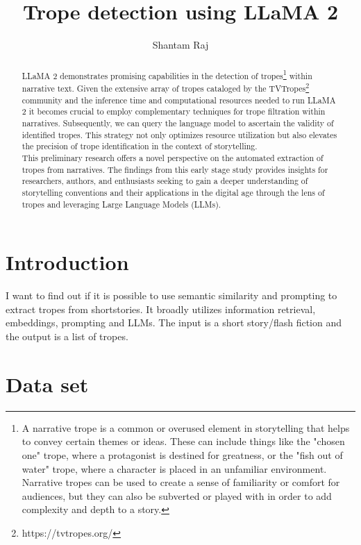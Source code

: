 \documentclass[11pt]{article}
\title{Trope detection using LLaMA 2 \\


}
\author{Shantam Raj}
\begin{document}
\maketitle

\begin{abstract}
LLaMA 2 \cite{touvron_2023_llama} demonstrates promising capabilities in the detection of tropes\footnote[1]{A narrative trope is a common or overused element in storytelling that helps to convey certain themes or ideas. These can include things like the "chosen one" trope, where a protagonist is destined for greatness, or the "fish out of water" trope, where a character is placed in an unfamiliar environment. Narrative tropes can be used to create a sense of familiarity or comfort for audiences, but they can also be subverted or played with in order to add complexity and depth to a story.} within narrative text. Given the extensive array of tropes cataloged by the TVTropes\footnote[2]{https://tvtropes.org/} community and the inference time and computational resources needed to run LLaMA 2 it becomes crucial to employ complementary techniques for trope filtration within narratives. Subsequently, we can query the language model to ascertain the validity of identified tropes. This strategy not only optimizes resource utilization but also elevates the precision of trope identification in the context of storytelling.
\\
This preliminary research offers a novel perspective on the automated extraction of tropes from narratives. The findings from this early stage study provides insights for researchers, authors, and enthusiasts seeking to gain a deeper understanding of storytelling conventions and their applications in the digital age through the lens of tropes and leveraging Large Language Models (LLMs).
\end{abstract}

\section{Introduction}
I want to find out if it is possible to use semantic similarity and prompting to extract tropes from shortstories. It broadly utilizes information retrieval, embeddings, prompting and LLMs. The input is a short story/flash fiction and the output is a list of tropes.

\section{Data set}
\end{document}
